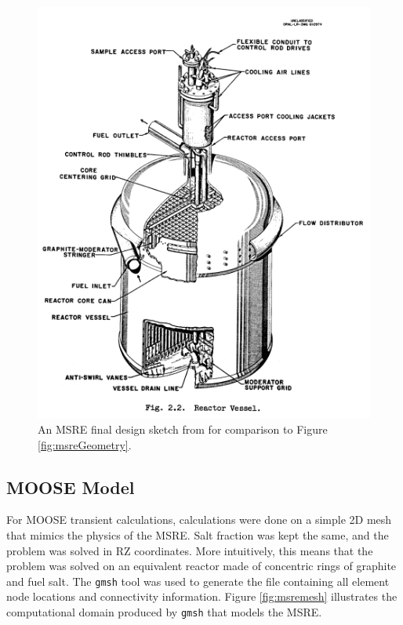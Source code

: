 \documentclass[12pt]{article}
\begin{document}
\begin{figure}[ht]
\includegraphics[width=\textwidth]{actualMSRE.png}
\caption{An MSRE final design sketch from \cite{robertson_msre} for comparison to Figure \ref{fig:msreGeometry}.}
\label{fig:actualMSRE}
\end{figure}

\subsection{MOOSE Model}
For MOOSE transient calculations, calculations were done on a simple 2D mesh that mimics the physics of the MSRE. Salt fraction was kept the same, and the problem was solved in RZ coordinates. More intuitively, this means that the problem was solved on an equivalent reactor made of concentric rings of graphite and fuel salt.
The \texttt{gmsh} \cite{gmsh} tool was used to generate the file containing all element node locations and connectivity information.
Figure \ref{fig:msremesh} illustrates the computational domain produced by \texttt{gmsh} that models the MSRE.
\end{document}
